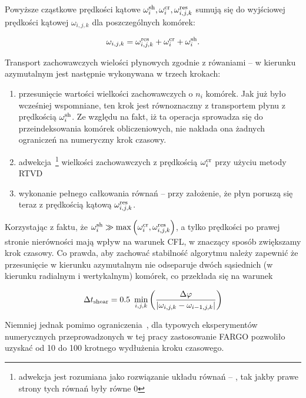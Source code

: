 Powyższe cząstkowe prędkości kątowe $\omega_i^{\rm sh}, \omega_i^{\rm cr},
\omega_{i,j,k}^{\rm res}$ sumują się do wyjściowej prędkości kątowej
$\omega_{i,j,k}$ dla poszczególnych komórek:

\begin{equation}
   \omega_{i,j,k} = \omega_{i,j,k}^{\rm res} + \omega_i^{\rm cr} + \omega_i^{\rm
sh}.
\end{equation}

Transport zachowawczych wielości płynowych zgodnie z rówaniami  --
 w kierunku azymutalnym jest następnie wykonywana w trzech krokach:

\begin{enumerate}
   \item przesunięcie wartości wielkości zachowawczych o $n_i$ komórek. Jak już
      było wcześniej wspomniane, ten krok jest równoznaczny z transportem płynu
      z prędkością $\omega_i^{\rm sh}$. Ze względu na fakt, iż ta operacja
      sprowadza się do przeindeksowania komórek obliczeniowych, nie nakłada ona
      żadnych ograniczeń na numeryczny krok czasowy.
   \item adwekcja~\footnote{adwekcja jest rozumiana jako rozwiązanie układu
         równań  -- , tak jakby prawe strony tych równań
      były równe 0} wielkości zachowawczych z prędkością $\omega_i^{\rm cr}$
      przy użyciu metody RTVD
   \item wykonanie pełnego całkowania równań  --  przy
      założenie, że płyn poruszą się teraz z prędkością kątową
      $\omega_{i,j,k}^{\rm res}$.
\end{enumerate}
Korzystając z faktu, że $\omega_i^{\rm sh} \gg \max\left(\omega_i^{\rm cr},
\omega_{i,j,k}^{\rm res}\right)$, a tylko prędkości po prawej stronie
nierówności mają wpływ na warunek CFL, w znaczący sposób zwiększamy krok
czasowy. Co prawda, aby zachować stabilność algorytmu należy zapewnić że
przesunięcie w kierunku azymutalnym nie odseparuje dwóch sąsiednich (w kierunku
radialnym i wertykalnym) komórek, co przekłada się na warunek

\begin{equation}\label{eq:tshear}
   \Delta t_{\rm shear} = 0.5 ~ \min_{i,j,k} \left( \frac{\Delta\varphi}
   {|\omega_{i,j,k} - \omega_{i-1,j,k}|} \right)
\end{equation}

Niemniej jednak pomimo ograniczenia~, dla typowych eksperymentów
numerycznych przeprowadzonych w tej pracy zastosowanie FARGO pozwoliło uzyskać
od 10 do 100 krotnego wydłużenia kroku czasowego.


